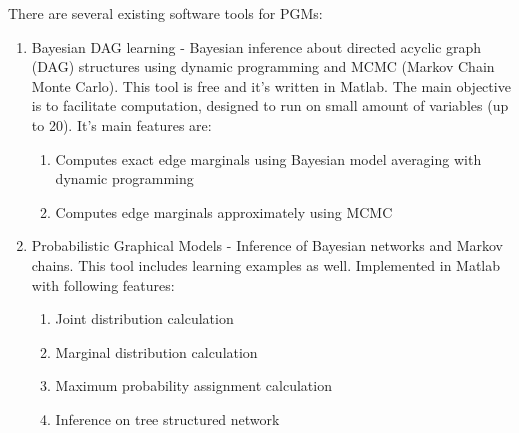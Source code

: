 \documentclass{article}
\newcommand{\comment}[2]{
	\todo[color=GreenYellow,inline]{
		\underline{\textbf{#1:}} #2
	}}
\begin{document}
    
    There are several existing software tools for PGMs:
    \begin{enumerate}
        \item Bayesian DAG learning \cite{KevinMurphy} - Bayesian inference about directed acyclic graph (DAG) structures using dynamic programming and MCMC (Markov Chain Monte Carlo). This tool is free and it's written in Matlab. The main objective is to facilitate computation, designed to run on small amount of variables (up to 20). It's main features are:
        \begin{enumerate}
            \item Computes exact edge marginals using Bayesian model averaging with dynamic programming
            \item Computes edge marginals approximately using MCMC
        \end{enumerate}
        \item Probabilistic Graphical Models \cite{Probabilistic Graphical Model Library} - Inference of Bayesian networks and Markov chains. This tool includes learning examples as well. Implemented in Matlab with following features:
        \begin{enumerate}
            \item Joint distribution calculation
            \item Marginal distribution calculation
            \item Maximum probability assignment calculation
            \item Inference on tree structured network
        \end{enumerate}

\end{enumerate}
\end{document}
